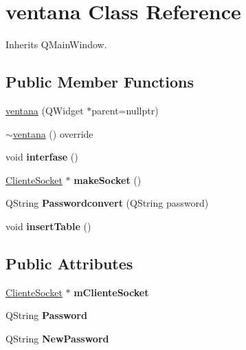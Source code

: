 \hypertarget{classventana}{}\section{ventana Class Reference}
\label{classventana}


Inherits Q\+Main\+Window.

\subsection*{Public Member Functions}
\begin{DoxyCompactItemize}
\item 
\hyperlink{classventana_afbce0fd8bf747b0209927282b17cdd6a}{ventana} (Q\+Widget $\ast$parent=nullptr)
\item 
\hyperlink{classventana_a33913e071b5ce652bb85a731dbba44c4}{$\sim$ventana} () override
\item 
\mbox{\label{classventana_ae4c3eb5e32a901eda01406d6887e5f99}} 
void {\bfseries interfase} ()
\item 
\mbox{\label{classventana_a4bbcfd58be5ed3d6a2f4ebe37b45060e}} 
\hyperlink{class_cliente_socket}{Cliente\+Socket} $\ast$ {\bfseries make\+Socket} ()
\item 
\mbox{\label{classventana_ab3a51568bd0f0bef9e6a0c3a766d7b6d}} 
Q\+String {\bfseries Passwordconvert} (Q\+String password)
\item 
\mbox{\label{classventana_a4607e77d398791df4f2cc4b68b396f5b}} 
void {\bfseries insert\+Table} ()
\end{DoxyCompactItemize}
\subsection*{Public Attributes}
\begin{DoxyCompactItemize}
\item 
\mbox{\label{classventana_a7189e350e451af491212fc624b71041d}} 
\hyperlink{class_cliente_socket}{Cliente\+Socket} $\ast$ {\bfseries m\+Cliente\+Socket}
\item 
\mbox{\label{classventana_a742127c8e9bb7ea0d54a5633492b258f}} 
Q\+String {\bfseries Password}
\item 
\mbox{\label{classventana_a7905f5f812b67d6dbe38478f29471078}} 
Q\+String {\bfseries New\+Password}
\end{DoxyCompactItemize}
